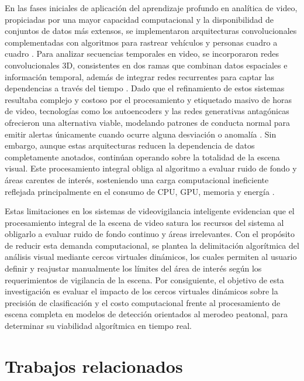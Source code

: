 \documentclass[runningheads]{llncs}
\begin{document}
En las fases iniciales de aplicación del aprendizaje profundo en analítica de video, propiciadas por una mayor capacidad computacional y la disponibilidad de conjuntos de datos más extensos, se implementaron arquitecturas convolucionales complementadas con algoritmos para rastrear vehículos y personas cuadro a cuadro \cite{vinod2024,nayak2019}. Para analizar secuencias temporales en video, se incorporaron redes convolucionales 3D, consistentes en dos ramas que combinan datos espaciales e información temporal, además de integrar redes recurrentes para captar las dependencias a través del tiempo \cite{mehmood2021,choudhry2023}. Dado que el refinamiento de estos sistemas resultaba complejo y costoso por el procesamiento y etiquetado masivo de horas de video, tecnologías como los autoencoders y las redes generativas antagónicas ofrecieron una alternativa viable, modelando patrones de conducta normal para emitir alertas únicamente cuando ocurre alguna desviación o anomalía \cite{choudhry2023}. Sin embargo, aunque estas arquitecturas reducen la dependencia de datos completamente anotados, continúan operando sobre la totalidad de la escena visual. Este procesamiento integral obliga al algoritmo a evaluar ruido de fondo y áreas carentes de interés, sosteniendo una carga computacional ineficiente reflejada principalmente en el consumo de CPU, GPU, memoria y energía \cite{vinod2024}.

Estas limitaciones en los sistemas de videovigilancia inteligente evidencian que el procesamiento integral de la escena de video satura los recursos del sistema al obligarlo a evaluar ruido de fondo continuo y áreas irrelevantes. Con el propósito de reducir esta demanda computacional, se plantea la delimitación algorítmica del análisis visual mediante cercos virtuales dinámicos, los cuales permiten al usuario definir y reajustar manualmente los límites del área de interés según los requerimientos de vigilancia de la escena. Por consiguiente, el objetivo de esta investigación es evaluar el impacto de los cercos virtuales dinámicos sobre la precisión de clasificación y el costo computacional frente al procesamiento de escena completa en modelos de detección orientados al merodeo peatonal, para determinar su viabilidad algorítmica en tiempo real.



%
%
%
\section{Trabajos relacionados}
\end{document}

